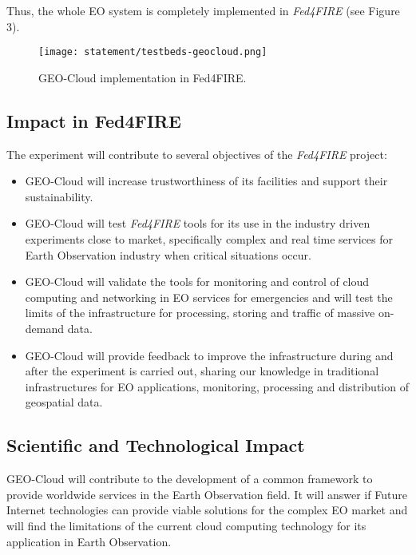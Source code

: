 Thus, the whole \ac{EO} system is completely implemented in \emph{Fed4FIRE} (see Figure 3).

\begin{figure}[!h]
\begin{center}
\texttt{[image: statement/testbeds-geocloud.png]}
\caption{GEO-Cloud implementation in Fed4FIRE.}
\label{fig:intr-testbeds-geocloud}
\end{center}
\end{figure}




\subsection{Impact in Fed4FIRE}
The experiment will contribute to several objectives of the \emph{Fed4FIRE}
project:
\begin{itemize}
\item GEO-Cloud will increase trustworthiness of its facilities and support their
sustainability.
\item GEO-Cloud will test \emph{Fed4FIRE} tools for its use in the industry
driven experiments close to market, specifically complex and real time services
for Earth Observation industry when critical situations occur.
\item GEO-Cloud will validate the tools for monitoring and control of cloud computing
and networking in EO services for emergencies and will test the limits of the
infrastructure for processing, storing and traffic of massive on-demand
data.
\item GEO-Cloud will provide feedback to improve the infrastructure during and
after the experiment is carried out, sharing our knowledge in traditional
infrastructures for \ac{EO} applications, monitoring, processing and
distribution of geospatial data.
\end{itemize}

\subsection{Scientific and Technological Impact}

GEO-Cloud will contribute to the development of a common framework to provide worldwide services in the Earth
Observation field. It will answer if Future Internet technologies can provide
viable solutions for the complex \ac{EO} market and will find the limitations of
the current cloud computing technology for its application in Earth Observation.

